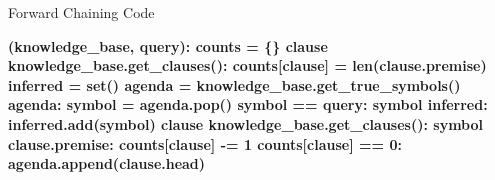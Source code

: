 \documentclass[14pt]{beamer}
\begin{document}
\begin{frame}[fragile]{Forward Chaining Code}
	\begin{semiverbatim}\bfseries\scriptsize
		 (knowledge_base, query):
		    \pause{}
		    counts = \{\}
		     clause  knowledge_base.get_clauses():
		        counts[clause] = len(clause.premise)
		    \pause{}
		    inferred = set()
		    agenda = knowledge_base.get_true_symbols()
		     agenda:
		        symbol = agenda.pop()
		        \pause{}
		         symbol == query:
		             
		        \pause{}
		         symbol  inferred:
		            inferred.add(symbol)
		            \pause{}
		             clause  knowledge_base.get_clauses():
		                 symbol  clause.premise:
		                    counts[clause] -= 1
		                     counts[clause] == 0:
		                        agenda.append(clause.head)
		    \pause{} 
	\end{semiverbatim}
\end{frame}
\end{document}

